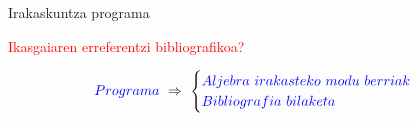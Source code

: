 \documentclass[
 10pt,%
 compress,%
 t,       %
 xcolor=svgnames
]{beamer}
\theoremstyle{definition} \newtheorem{definicion}{Definicion}[section]
\theoremstyle{propiedades} \newtheorem{propiedades}{Propiedades}[section]
\begin{document}
\begin{frame}{Irakaskuntza programa} 
	
	\medskip


\centering \textcolor{red}{Ikasgaiaren erreferentzi bibliografikoa?}

\medskip

\begin{align*}
\textcolor{blue}{Programa}
\ \Rightarrow \
%
\begin{cases}
\textcolor{blue}{Aljebra \ irakasteko \ modu \ berriak} \\
\textcolor{blue}{Bibliografia \ bilaketa} 
\end{cases}
\end{align*} 

	
	
	\medskip


\end{frame}
\end{document}
